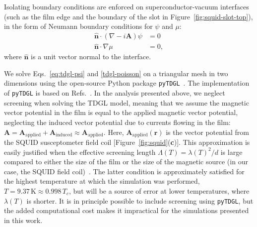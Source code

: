 \documentclass[%
 reprint,
 superscriptaddress,
 amsmath,
 amssymb,
 amsfonts,
 aps,
 prb,
]{revtex4-2}
\newcommand{\Tc}{T_c}
\begin{document}
Isolating boundary conditions are enforced on superconductor-vacuum interfaces (such as the film edge and the boundary of the slot in Figure~\ref{fig:squid-slot-top}), in the form of Neumann boundary conditions for $\psi$ and $\mu$:
\begin{subequations}
    \label{eq:bc-vacuum}
    \begin{align}
        \hat{\mathbf{n}}\cdot(\nabla-i\mathbf{A})\psi &= 0\label{eq:bc-vacuum-psi}\\
        \hat{\mathbf{n}}\cdot\nabla\mu &= 0\label{eq:bc-vacuum-mu},
    \end{align}
\end{subequations}
where $\hat{\mathbf{n}}$ is a unit vector normal to the interface.

We solve Eqs.~\ref{eq:tdgl-psi} and \ref{tdgl-poisson} on a triangular mesh in two dimensions using the open-source Python package \texttt{pyTDGL}~\cite{Bishop-Van_Horn2023-dm}. The implementation of \texttt{pyTDGL} is based on Refs.~\cite{Jonsson2022-mb, Jonsson2022-xe, Gropp1996-uw, Du1998-kt}. In the analysis presented above, we neglect screening when solving the TDGL model, meaning that we assume the magnetic vector potential in the film is equal to the applied magnetic vector potential, neglecting the induced vector potential due to currents flowing in the film: $\mathbf{A}=\mathbf{A}_\mathrm{applied} + \mathbf{A}_\mathrm{induced}\approx\mathbf{A}_\mathrm{applied}$. Here, $\mathbf{A}_\mathrm{applied}(\mathbf{r})$ is the vector potential from the SQUID susceptometer field coil [Figure~\ref{fig:squid}({\bf c})]. This approximation is easily justified when the effective screening length $\Lambda(T)=\lambda(T)^2/d$ is large compared to either the size of the film or the size of the magnetic source (in our case, the SQUID field coil)~\cite{Tinkham2004-ln, Lemberger2013-lu}. The latter condition is approximately satisfied for the highest temperature at which the simulation was performed, $T=9.37\,\mathrm{K} \approx 0.998\,\Tc$, but will be a source of error at lower temperatures, where $\lambda(T)$ is shorter. It is in principle possible to include screening using \texttt{pyTDGL}, but the added computational cost makes it impractical for the simulations presented in this work.


\end{document}
